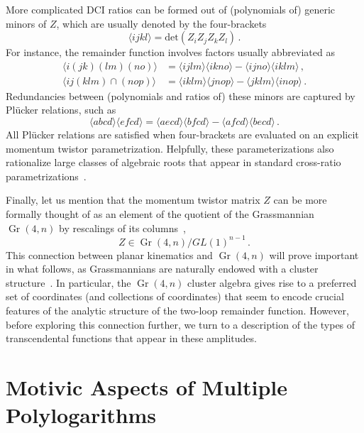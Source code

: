 \documentclass[11pt]{article}
\DeclareMathOperator{\Gr}{Gr}
\def\ket#1{\langle #1 \rangle}
\begin{document}
More complicated DCI ratios can be formed out of (polynomials of) generic minors of $Z$, which are usually denoted by the four-brackets
\begin{equation} \label{eq:four_bracket_def}
\langle i j k l \rangle = \text{det}(Z_i Z_j Z_k Z_l) \, .
\end{equation}
For instance, the remainder function involves factors usually abbreviated as 
\begin{align}
\langle i (j k)( l m) (n o)\rangle &= 
\langle i j l m \rangle \langle i k n o \rangle - \langle i j n o\rangle \langle i k l m \rangle \, , \label{eq:abbrev_1} \\
\langle i j (k l m) \cap (n o p) \rangle &= 
 \langle i k l m \rangle \langle j n o p \rangle - \langle j k l m \rangle \langle i n o p \rangle \, . \label{eq:abbrev_2}
\end{align} 
Redundancies between (polynomials and ratios of) these minors are captured by Pl\"ucker relations, such as
\begin{equation}
  \label{eq:plucker-rel}
  \ket{abcd} \ket{efcd} = \ket{aecd} \ket{bfcd} - \ket{afcd}\ket{becd} \, .
\end{equation}
All Pl\"ucker relations are satisfied when four-brackets are evaluated on an explicit momentum twistor parametrization. Helpfully, these parameterizations also rationalize large classes of algebraic roots that appear in standard cross-ratio parametrizations~\cite{Bourjaily:2018aeq}. 

Finally, let us mention that the momentum twistor matrix $Z$ can be more formally thought of as an element of the quotient of the Grassmannian $\Gr(4,n)$ by rescalings of its columns~\cite{ArkaniHamed:2012nw},
\begin{equation}
Z \in \Gr(4,n)/GL(1)^{n-1} \, .
\end{equation}
This connection between planar kinematics and $\Gr(4,n)$ will prove important in what follows, as Grassmannians are naturally endowed with a cluster structure~\cite{1021.16017,Golden:2013xva}. In particular, the $\Gr(4,n)$ cluster algebra gives rise to a preferred set of  coordinates (and collections of coordinates) that seem to encode crucial features of the analytic structure of the two-loop remainder function. However, before exploring this connection further, we turn to a description of the types of transcendental functions that appear in these amplitudes.


\section{Motivic Aspects of Multiple Polylogarithms}
\label{sec:motivic_aspects_polylogs}
\end{document}
